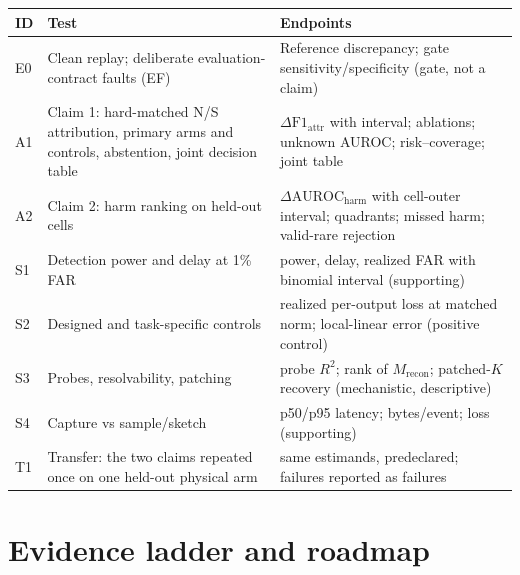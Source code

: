 \documentclass[10pt,twocolumn]{extarticle}
\begin{document}
\begin{center}
\scriptsize
{}
\begin{tabularx}{\columnwidth}{@{}p{0.16in}p{0.95in}Y@{}}
\toprule
ID & Test & Endpoints \\
\midrule
E0 & Clean replay; deliberate evaluation-contract faults (EF) & Reference
discrepancy; gate sensitivity/specificity (gate, not a claim) \\
A1 & Claim 1: hard-matched N/S attribution, primary arms and controls,
abstention, joint decision table & $\Delta\mathrm{F1}_{\mathrm{attr}}$ with
interval; ablations; unknown AUROC; risk--coverage; joint table \\
A2 & Claim 2: harm ranking on held-out cells & $\Delta\mathrm{AUROC}_{\mathrm{harm}}$
with cell-outer interval; quadrants; missed harm; valid-rare rejection \\
S1 & Detection power and delay at 1\% FAR & power, delay, realized FAR with
binomial interval (supporting) \\
S2 & Designed and task-specific controls & realized per-output loss at matched
norm; local-linear error (positive control) \\
S3 & Probes, resolvability, patching & probe $R^2$; rank of
$M_{\mathrm{recon}}$; patched-$K$ recovery (mechanistic, descriptive) \\
S4 & Capture vs sample/sketch & p50/p95 latency; bytes/event; loss (supporting) \\
T1 & Transfer: the two claims repeated once on one held-out physical arm &
same estimands, predeclared; failures reported as failures \\
\bottomrule
\end{tabularx}
\label{tab:experiments}
\vspace{-0.5em}
\end{center}

\section{Evidence ladder and roadmap}
\end{document}
